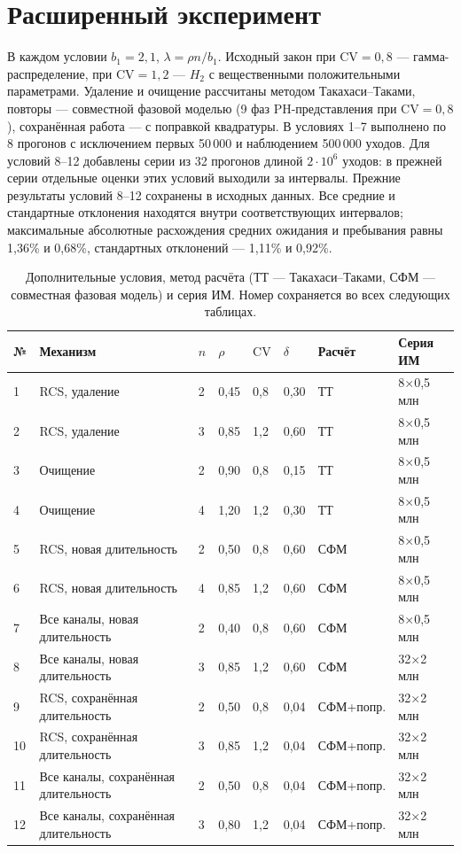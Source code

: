 \documentclass[a4paper,12pt]{article}
\begin{document}
\section{Расширенный эксперимент}
В каждом условии \(b_1=2{,}1\), \(\lambda=\rho n/b_1\). Исходный закон при \(\mathrm{CV}=0{,}8\) --- гамма-распределение, при \(\mathrm{CV}=1{,}2\) --- \(H_2\) с вещественными положительными параметрами. Удаление и очищение рассчитаны методом Такахаси--Таками, повторы --- совместной фазовой моделью (9 фаз PH-представления при \(\mathrm{CV}=0{,}8\)), сохранённая работа --- с поправкой квадратуры. В условиях 1--7 выполнено по 8 прогонов с исключением первых 50\,000 и наблюдением 500\,000 уходов. Для условий 8--12 добавлены серии из 32 прогонов длиной \(2\cdot10^6\) уходов: в прежней серии отдельные оценки этих условий выходили за интервалы. Прежние результаты условий 8--12 сохранены в исходных данных. Все средние и стандартные отклонения находятся внутри соответствующих интервалов; максимальные абсолютные расхождения средних ожидания и пребывания равны 1,36\% и 0,68\%, стандартных отклонений --- 1,11\% и 0,92\%.

\begin{table}[!htbp]
\centering\small\setlength{\tabcolsep}{2pt}
\begin{tabular}{@{}p{0.9cm}p{5.2cm}p{0.7cm}p{1.2cm}p{1.0cm}p{1.2cm}p{2.5cm}p{2.2cm}@{}}
\toprule
№ & Механизм & $n$ & $\rho$ & $\mathrm{CV}$ & $\delta$ & Расчёт & Серия ИМ \\
\midrule
1 & RCS, удаление & 2 & 0,45 & 0,8 & 0,30 & ТТ & 8×0,5 млн \\
2 & RCS, удаление & 3 & 0,85 & 1,2 & 0,60 & ТТ & 8×0,5 млн \\
3 & Очищение & 2 & 0,90 & 0,8 & 0,15 & ТТ & 8×0,5 млн \\
4 & Очищение & 4 & 1,20 & 1,2 & 0,30 & ТТ & 8×0,5 млн \\
5 & RCS, новая длительность & 2 & 0,50 & 0,8 & 0,60 & СФМ & 8×0,5 млн \\
6 & RCS, новая длительность & 4 & 0,85 & 1,2 & 0,60 & СФМ & 8×0,5 млн \\
7 & Все каналы, новая длительность & 2 & 0,40 & 0,8 & 0,60 & СФМ & 8×0,5 млн \\
8 & Все каналы, новая длительность & 3 & 0,85 & 1,2 & 0,60 & СФМ & 32×2 млн \\
9 & RCS, сохранённая длительность & 2 & 0,50 & 0,8 & 0,04 & СФМ+попр. & 32×2 млн \\
10 & RCS, сохранённая длительность & 3 & 0,85 & 1,2 & 0,04 & СФМ+попр. & 32×2 млн \\
11 & Все каналы, сохранённая длительность & 2 & 0,50 & 0,8 & 0,04 & СФМ+попр. & 32×2 млн \\
12 & Все каналы, сохранённая длительность & 3 & 0,80 & 1,2 & 0,04 & СФМ+попр. & 32×2 млн \\
\bottomrule
\end{tabular}
\caption{Дополнительные условия, метод расчёта (ТТ --- Такахаси--Таками, СФМ --- совместная фазовая модель) и серия ИМ. Номер сохраняется во всех следующих таблицах.}
\label{tab:parameters}
\end{table}
\end{document}
